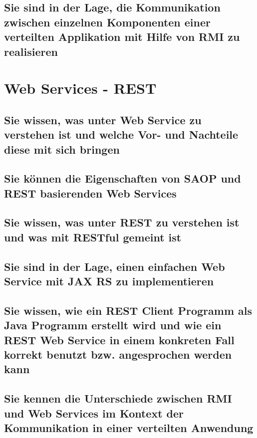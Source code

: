 \documentclass[a4paper]{article}
\begin{document}
		\subsection{Sie sind in der Lage, die Kommunikation zwischen einzelnen Komponenten einer verteilten Applikation mit Hilfe von RMI zu realisieren}
		
		
		
	
	\newpage
	\section{Web Services - REST}
	
		
		\subsection{Sie wissen, was unter Web Service zu verstehen ist und welche Vor- und Nachteile diese mit sich bringen}
		
		
		
		\subsection{Sie können die Eigenschaften von SAOP und REST basierenden Web Services}
		
		
		
		\subsection{Sie wissen, was unter REST zu verstehen ist und was mit RESTful gemeint ist}
		
		
		
		\subsection{Sie sind in der Lage, einen einfachen Web Service mit JAX RS zu implementieren}
		
		
		
		\subsection{Sie wissen, wie ein REST Client Programm als Java Programm erstellt wird und wie ein REST Web Service in einem konkreten Fall korrekt benutzt bzw. angesprochen werden kann}
		
		
		
		\subsection{Sie kennen die Unterschiede zwischen RMI und Web Services im Kontext der Kommunikation in einer verteilten Anwendung}
		
\end{document}
